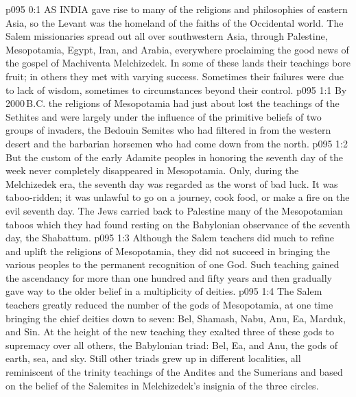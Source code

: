 \vs p095 0:1 AS INDIA gave rise to many of the religions and philosophies of eastern Asia, so the Levant was the homeland of the faiths of the Occidental world. The Salem missionaries spread out all over southwestern Asia, through Palestine, Mesopotamia, Egypt, Iran, and Arabia, everywhere proclaiming the good news of the gospel of Machiventa Melchizedek. In some of these lands their teachings bore fruit; in others they met with varying success. Sometimes their failures were due to lack of wisdom, sometimes to circumstances beyond their control.
\vs p095 1:1 By 2000\,B.C. the religions of Mesopotamia had just about lost the teachings of the Sethites and were largely under the influence of the primitive beliefs of two groups of invaders, the Bedouin Semites who had filtered in from the western desert and the barbarian horsemen who had come down from the north.
\vs p095 1:2 But the custom of the early Adamite peoples in honoring the seventh day of the week never completely disappeared in Mesopotamia. Only, during the Melchizedek era, the seventh day was regarded as the worst of bad luck. It was taboo\hyp{}ridden; it was unlawful to go on a journey, cook food, or make a fire on the evil seventh day. The Jews carried back to Palestine many of the Mesopotamian taboos which they had found resting on the Babylonian observance of the seventh day, the Shabattum.
\vs p095 1:3 Although the Salem teachers did much to refine and uplift the religions of Mesopotamia, they did not succeed in bringing the various peoples to the permanent recognition of one God. Such teaching gained the ascendancy for more than one hundred and fifty years and then gradually gave way to the older belief in a multiplicity of deities.
\vs p095 1:4 The Salem teachers greatly reduced the number of the gods of Mesopotamia, at one time bringing the chief deities down to seven: Bel, Shamash, Nabu, Anu, Ea, Marduk, and Sin. At the height of the new teaching they exalted three of these gods to supremacy over all others, the Babylonian triad: Bel, Ea, and Anu, the gods of earth, sea, and sky. Still other triads grew up in different localities, all reminiscent of the trinity teachings of the Andites and the Sumerians and based on the belief of the Salemites in Melchizedek’s insignia of the three circles.
